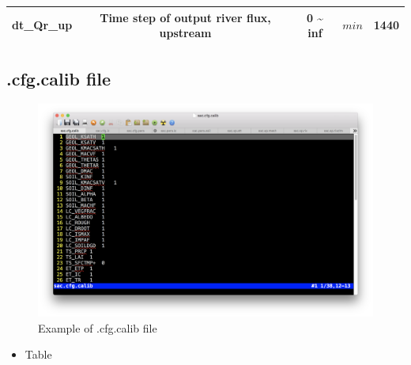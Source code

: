 \documentclass[]{scrbook}
\providecommand{\tightlist}{%
  \setlength{\itemsep}{0pt}\setlength{\parskip}{0pt}}
\begin{document}
\begin{longtable}[]{@{}ccccc@{}}
\begin{minipage}[t]{0.17\columnwidth}
dt\_Qr\_up\strut
\end{minipage} & \begin{minipage}[t]{0.23\columnwidth}\centering\strut
Time step of output river flux, upstream\strut
\end{minipage} & \begin{minipage}[t]{0.10\columnwidth}\centering\strut
0 \textasciitilde{} inf\strut
\end{minipage} & \begin{minipage}[t]{0.10\columnwidth}\centering\strut
\(min\)\strut
\end{minipage} & \begin{minipage}[t]{0.26\columnwidth}\centering\strut
1440\strut
\end{minipage}\tabularnewline
\bottomrule
\end{longtable}

\subsection{.cfg.calib file}\label{cfg.calib-file}

\begin{figure}
\centering
\includegraphics{Fig/IO/cfg.calib.png}
\caption{Example of .cfg.calib file}
\end{figure}

\begin{itemize}
\tightlist
\item
  Table
\end{itemize}
\end{document}
